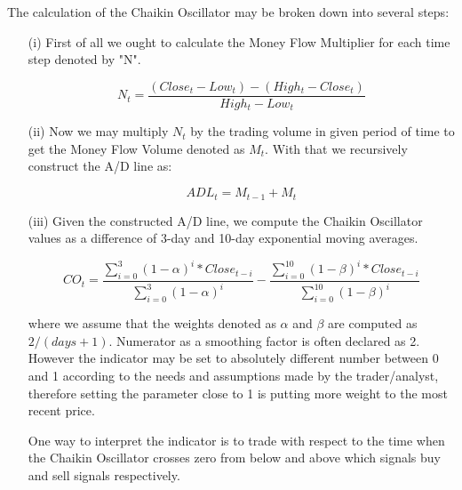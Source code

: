 The calculation of the Chaikin Oscillator may be broken down into several steps:
\begin{itemize}
\item[(i)] First of all we ought to calculate the Money Flow Multiplier for each time step denoted by "N".

\begin{equation}
N_{t} = \frac{(Close_{t} - Low_{t}) - (High_{t} - Close_{t})}{High_{t} - Low_{t}}
\end{equation}

\item[(ii)] Now we may multiply $N_t$ by the trading volume in given period of time to get the Money Flow Volume denoted as $M_t$. With that we recursively construct the A/D line as:

\begin{equation}
ADL_t = M_{t-1} + M_t
\end{equation}

\item[(iii)] Given the constructed A/D line, we compute the Chaikin Oscillator values as a difference of 3-day and 10-day exponential moving averages.

\begin{equation}
CO_t = \frac{\sum_{i=0}^{3} (1-\alpha)^i*Close_{t-i}}{\sum_{i=0}^{3} (1-\alpha)^i} - \frac{\sum_{i=0}^{10} (1-\beta)^i*Close_{t-i}}{\sum_{i=0}^{10} (1-\beta)^i}
\end{equation}

where we assume that the weights denoted as $\alpha$ and $\beta$ are computed as $2/(days + 1)$. Numerator as a smoothing factor is often declared as 2. However the indicator may be set to absolutely different number between 0 and 1 according to the needs and assumptions made by the trader/analyst, therefore setting the parameter close to 1 is putting more weight to the most recent price.

One way to interpret the indicator is to trade with respect to the time when the Chaikin Oscillator crosses zero from below and above which signals buy and sell signals respectively.

\end{itemize}


